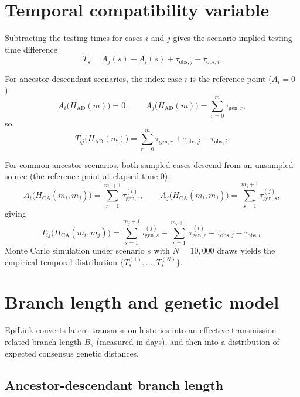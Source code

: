 \documentclass[11pt,a4paper]{article}
\begin{document}
\section{Temporal compatibility variable}
\label{sec:S1_temporal}

Subtracting the testing times for cases $i$ and $j$ gives the scenario-implied testing-time difference
\[
T_s = A_j(s) - A_i(s) + \tau_{\mathrm{obs},j} - \tau_{\mathrm{obs},i}.
\]

For ancestor-descendant scenarios, the index case $i$ is the reference point ($A_i = 0$):
\[
A_i\!\bigl(H_{\mathrm{AD}}(m)\bigr) = 0, \qquad
A_j\!\bigl(H_{\mathrm{AD}}(m)\bigr) = \sum_{r=0}^{m} \tau_{\mathrm{gen},r},
\]
so
\[
T_{ij}\!\bigl(H_{\mathrm{AD}}(m)\bigr)
= \sum_{r=0}^{m} \tau_{\mathrm{gen},r}
+ \tau_{\mathrm{obs},j}
- \tau_{\mathrm{obs},i}.
\]

For common-ancestor scenarios, both sampled cases descend from an unsampled source (the reference point at elapsed time 0):
\[
A_i\!\bigl(H_{\mathrm{CA}}(m_i,m_j)\bigr)
= \sum_{r=1}^{m_i+1} \tau_{\mathrm{gen},r}^{(i)}, \qquad
A_j\!\bigl(H_{\mathrm{CA}}(m_i,m_j)\bigr)
= \sum_{s=1}^{m_j+1} \tau_{\mathrm{gen},s}^{(j)},
\]
giving
\[
T_{ij}\!\bigl(H_{\mathrm{CA}}(m_i,m_j)\bigr)
= \sum_{s=1}^{m_j+1} \tau_{\mathrm{gen},s}^{(j)}
- \sum_{r=1}^{m_i+1} \tau_{\mathrm{gen},r}^{(i)}
+ \tau_{\mathrm{obs},j}
- \tau_{\mathrm{obs},i}.
\]
Monte Carlo simulation under scenario $s$ with $N = 10{,}000$ draws yields the empirical temporal distribution $\{T_s^{(1)},\ldots,T_s^{(N)}\}$.

\section{Branch length and genetic model}
\label{sec:S1_genetic}

EpiLink converts latent transmission histories into an effective transmission-related branch length $B_s$ (measured in days), and then into a distribution of expected consensus genetic distances.

\subsection{Ancestor-descendant branch length}
\label{sec:S1_ad_branch}
\end{document}
